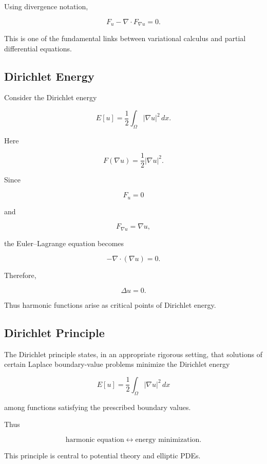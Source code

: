 Using divergence notation,

\[
\boxed{
F_u
-
\nabla\cdot
F_{\nabla u}
=
0.
}
\]

This is one of the fundamental links between variational calculus and
partial differential equations.

\subsection{Dirichlet Energy}
\label{subsec:dirichlet-energy}

Consider the Dirichlet energy

\[
\boxed{
E[u]
=
\frac12
\int_\Omega
|\nabla u|^2\,dx.
}
\]

Here

\[
F(\nabla u)
=
\frac12|\nabla u|^2.
\]

Since

\[
F_u=0
\]

and

\[
F_{\nabla u}
=
\nabla u,
\]

the Euler--Lagrange equation becomes

\[
-\nabla\cdot(\nabla u)=0.
\]

Therefore,

\[
\boxed{
\Delta u=0.
}
\]

Thus harmonic functions arise as critical points of Dirichlet energy.

\subsection{Dirichlet Principle}
\label{subsec:dirichlet-principle}

The Dirichlet principle states, in an appropriate rigorous setting, that
solutions of certain Laplace boundary-value problems minimize the
Dirichlet energy

\[
\boxed{
E[u]
=
\frac12
\int_\Omega
|\nabla u|^2\,dx
}
\]

among functions satisfying the prescribed boundary values.

Thus

\[
\boxed{
\text{harmonic equation}
\longleftrightarrow
\text{energy minimization}.
}
\]

This principle is central to potential theory and elliptic PDEs.

